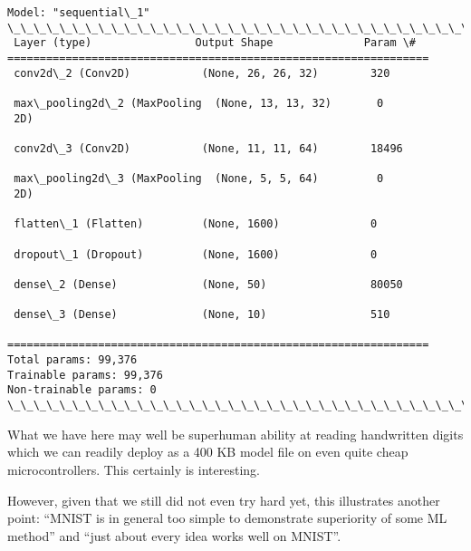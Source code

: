 \documentclass[11pt]{article}
\begin{document}
    \begin{Verbatim}[commandchars=\\\{\}]
Model: "sequential\_1"
\_\_\_\_\_\_\_\_\_\_\_\_\_\_\_\_\_\_\_\_\_\_\_\_\_\_\_\_\_\_\_\_\_\_\_\_\_\_\_\_\_\_\_\_\_\_\_\_\_\_\_\_\_\_\_\_\_\_\_\_\_\_\_\_\_
 Layer (type)                Output Shape              Param \#
=================================================================
 conv2d\_2 (Conv2D)           (None, 26, 26, 32)        320

 max\_pooling2d\_2 (MaxPooling  (None, 13, 13, 32)       0
 2D)

 conv2d\_3 (Conv2D)           (None, 11, 11, 64)        18496

 max\_pooling2d\_3 (MaxPooling  (None, 5, 5, 64)         0
 2D)

 flatten\_1 (Flatten)         (None, 1600)              0

 dropout\_1 (Dropout)         (None, 1600)              0

 dense\_2 (Dense)             (None, 50)                80050

 dense\_3 (Dense)             (None, 10)                510

=================================================================
Total params: 99,376
Trainable params: 99,376
Non-trainable params: 0
\_\_\_\_\_\_\_\_\_\_\_\_\_\_\_\_\_\_\_\_\_\_\_\_\_\_\_\_\_\_\_\_\_\_\_\_\_\_\_\_\_\_\_\_\_\_\_\_\_\_\_\_\_\_\_\_\_\_\_\_\_\_\_\_\_
    \end{Verbatim}

    What we have here may well be superhuman ability at reading handwritten
digits which we can readily deploy as a 400 KB model file on even quite
cheap microcontrollers. This certainly is interesting.

However, given that we still did not even try hard yet, this illustrates
another point: ``MNIST is in general too simple to demonstrate
superiority of some ML method'' and ``just about every idea works well
on MNIST''.
\end{document}

